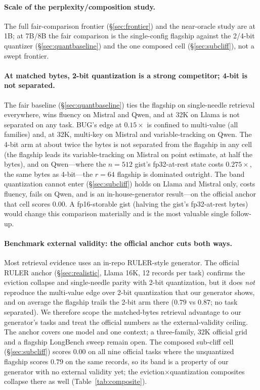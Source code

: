 \documentclass[11pt]{article}
\begin{document}
\paragraph{Scale of the perplexity/composition study.} The full
fair-comparison frontier (\S\ref{sec:frontier}) and the near-oracle study are at
1B; at 7B/8B the fair comparison is the single-config flagship against the
2/4-bit quantizer (\S\ref{sec:quantbaseline}) and the one composed cell
(\S\ref{sec:subcliff}), not a swept frontier.

\paragraph{At matched bytes, 2-bit quantization is a strong competitor; 4-bit is
not separated.} The fair baseline (\S\ref{sec:quantbaseline}) ties the
flagship on single-needle retrieval everywhere, wins fluency on Mistral and Qwen,
and at 32K on Llama is not separated on any task. BUG's edge at $0.15\times$ is
confined to multi-value (all families) and, at 32K, multi-key on Mistral and
variable-tracking on Qwen. The 4-bit arm at about twice the bytes is not separated
from the flagship in any cell (the flagship leads its variable-tracking on Mistral
on point estimate, at half the bytes), and on Qwen---where the $n{=}512$ gist's
fp32-at-rest state costs $0.275\times$, the same bytes as 4-bit---the $r{=}64$
flagship is dominated outright. The band quantization cannot enter
(\S\ref{sec:subcliff}) holds on Llama and Mistral only, costs fluency, fails
on Qwen, and is an in-house-generator result---on the official anchor that cell
scores $0.00$. A fp16-storable gist (halving the gist's fp32-at-rest bytes) would change this
comparison materially and is the most valuable single follow-up.

\paragraph{Benchmark external validity: the official anchor cuts both ways.}
Most retrieval evidence uses an in-repo RULER-style generator. The official
RULER anchor (\S\ref{sec:realistic}, Llama 16K, 12 records per task) confirms
the eviction collapse and single-needle parity with 2-bit quantization, but it
does \emph{not} reproduce the multi-value edge over 2-bit quantization that our
generator shows, and on average the flagship trails the 2-bit arm there ($0.79$
vs $0.87$; no task separated). We therefore scope the matched-bytes retrieval
advantage to our generator's tasks and treat the official numbers as the
external-validity ceiling. The anchor covers one model and one context; a
three-family, 32K official grid and a flagship LongBench sweep remain open. The
composed sub-cliff cell (\S\ref{sec:subcliff}) scores $0.00$ on all nine official
tasks where the unquantized flagship scores $0.79$ on the same records, so its band
is a property of our generator with no external validity yet; the
eviction$\times$quantization composites collapse there as well
(Table~\ref{tab:composite}).
\end{document}
